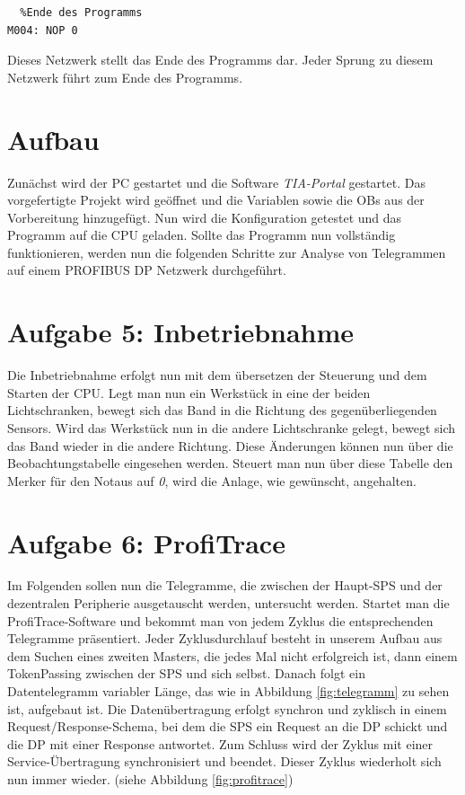\documentclass{report}
\begin{document}
\begin{lstlisting}
  %Ende des Programms
M004: NOP 0
\end{lstlisting}
Dieses Netzwerk stellt das Ende des Programms dar. Jeder Sprung zu diesem Netzwerk führt zum Ende des Programms.

\section{Aufbau}

Zunächst wird der PC gestartet und die Software \textit{TIA-Portal} gestartet. Das vorgefertigte Projekt wird geöffnet und die Variablen sowie die OBs aus der Vorbereitung hinzugefügt. Nun wird die Konfiguration getestet und das Programm auf die CPU geladen.
Sollte das Programm nun vollständig funktionieren, werden nun die folgenden Schritte zur Analyse von Telegrammen auf einem PROFIBUS DP Netzwerk durchgeführt.

\section{Aufgabe 5: Inbetriebnahme}

Die Inbetriebnahme erfolgt nun mit dem übersetzen der Steuerung und dem Starten der CPU. Legt man nun ein Werkstück in eine der beiden Lichtschranken, bewegt sich das Band in die Richtung des gegenüberliegenden Sensors. Wird das Werkstück nun in die andere Lichtschranke gelegt, bewegt sich das Band wieder in die andere Richtung. Diese Änderungen können nun über die Beobachtungstabelle eingesehen werden. Steuert man nun über diese Tabelle den Merker für den Notaus auf \textit{0}, wird die Anlage, wie gewünscht, angehalten.

\section{Aufgabe 6: ProfiTrace}

Im Folgenden sollen nun die Telegramme, die zwischen der Haupt-SPS und der dezentralen Peripherie ausgetauscht werden, untersucht werden. Startet man die ProfiTrace-Software und bekommt man von jedem Zyklus die entsprechenden Telegramme präsentiert. Jeder Zyklusdurchlauf besteht in unserem Aufbau aus dem Suchen eines zweiten Masters, die jedes Mal nicht erfolgreich ist, dann einem TokenPassing zwischen der SPS und sich selbst. Danach folgt ein Datentelegramm variabler Länge, das wie in Abbildung \ref{fig:telegramm} zu sehen ist, aufgebaut ist. Die Datenübertragung erfolgt synchron und zyklisch in einem Request/Response-Schema, bei dem die SPS ein Request an die DP schickt und die DP mit einer Response antwortet. Zum Schluss wird der Zyklus mit einer Service-Übertragung synchronisiert und beendet. Dieser Zyklus wiederholt sich nun immer wieder. (siehe Abbildung \ref{fig:profitrace})
\end{document}

